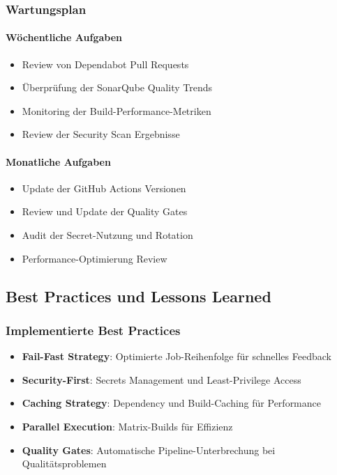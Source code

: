 \subsubsection{Wartungsplan}
\paragraph{Wöchentliche Aufgaben}
\begin{itemize}
    \item Review von Dependabot Pull Requests
    \item Überprüfung der SonarQube Quality Trends
    \item Monitoring der Build-Performance-Metriken
    \item Review der Security Scan Ergebnisse
\end{itemize}

\paragraph{Monatliche Aufgaben}
\begin{itemize}
    \item Update der GitHub Actions Versionen
    \item Review und Update der Quality Gates
    \item Audit der Secret-Nutzung und Rotation
    \item Performance-Optimierung Review
\end{itemize}

\subsection{Best Practices und Lessons Learned}

\subsubsection{Implementierte Best Practices}
\begin{itemize}
    \item \textbf{Fail-Fast Strategy}: Optimierte Job-Reihenfolge für schnelles Feedback
    \item \textbf{Security-First}: Secrets Management und Least-Privilege Access
    \item \textbf{Caching Strategy}: Dependency und Build-Caching für Performance
    \item \textbf{Parallel Execution}: Matrix-Builds für Effizienz
    \item \textbf{Quality Gates}: Automatische Pipeline-Unterbrechung bei Qualitätsproblemen
\end{itemize}

